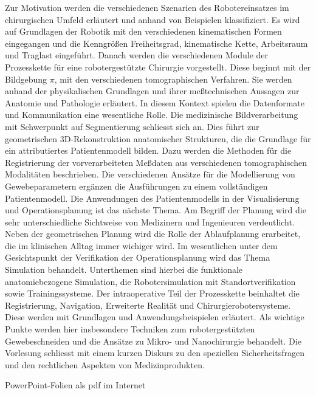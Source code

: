 \begin{course}
\begin{content}
Zur Motivation werden die verschiedenen Szenarien des Robotereinsatzes im chirurgischen Umfeld erläutert und anhand von Beispielen klassifiziert. Es wird auf Grundlagen der Robotik mit den verschiedenen kinematischen Formen eingegangen und die Kenngrößen Freiheitsgrad, kinematische Kette, Arbeitsraum und Traglast eingeführt. Danach werden die verschiedenen Module der Prozesskette für eine robotergestützte Chirurgie vorgestellt. Diese beginnt mit der Bildgebung $\pi{}$, mit den verschiedenen tomographischen Verfahren. Sie werden anhand der physikalischen Grundlagen und ihrer meßtechnischen Aussagen zur Anatomie und Pathologie erläutert. In diesem Kontext spielen die Datenformate und Kommunikation eine wesentliche Rolle. Die medizinische Bildverarbeitung mit Schwerpunkt auf Segmentierung schliesst sich an. Dies führt zur geometrischen 3D-Rekonstruktion anatomischer Strukturen, die die Grundlage für ein attributiertes Patientenmodell bilden. Dazu werden die Methoden für die Registrierung der vorverarbeiteten Meßdaten aus verschiedenen tomographischen Modalitäten beschrieben. Die verschiedenen Ansätze für die Modellierung von Gewebeparametern ergänzen die Ausführungen zu einem vollständigen Patientenmodell. Die Anwendungen des Patientenmodells in der Visualisierung und Operationsplanung ist das nächste Thema. Am Begriff der Planung wird die sehr unterschiedliche Sichtweise von Medizinern und Ingenieuren verdeutlicht. Neben der geometrischen Planung wird die Rolle der Ablaufplanung erarbeitet, die im klinischen Alltag immer wichiger wird. Im wesentlichen unter dem Gesichtspunkt der Verifikation der Operationsplanung wird das Thema Simulation behandelt. Unterthemen sind hierbei die funktionale anatomiebezogene Simulation, die Robotersimulation mit Standortverifikation sowie Trainingssysteme. Der intraoperative Teil der Prozesskette beinhaltet die Registrierung, Navigation, Erweiterte Realität und Chirurgierobotersysteme. Diese werden mit Grundlagen und Anwendungsbeispielen erläutert. Als wichtige Punkte werden hier insbesondere Techniken zum robotergestützten Gewebeschneiden und die Ansätze zu Mikro- und Nanochirurgie behandelt. Die Vorlesung schliesst mit einem kurzen Diskurs zu den speziellen Sicherheitsfragen und den rechtlichen Aspekten von Medizinprodukten.


\end{content}

\begin{media}PowerPoint-Folien als pdf im Internet


\end{media}
\end{course}
